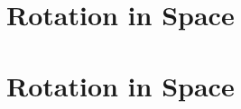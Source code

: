 \def\chapterbody{
  \section{Rotation in Space}

  
}

\ifx\bookmode\undefined
  

  \setcounter{section}{19}

  
    \chapterbody
  
\else
  \chapterbody
\fi
